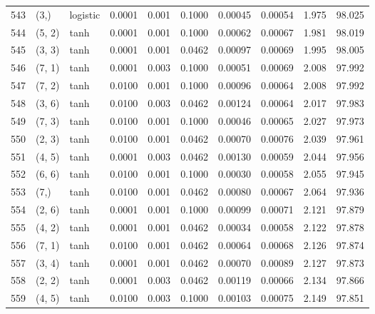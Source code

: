 \begin{tabular}{lllrrrrrrr}
543 &        (3,) &  logistic &  0.0001 &  0.001 &  0.1000 &          0.00045 &    0.00054 &       1.975 &    98.025 \\
544 &      (5, 2) &      tanh &  0.0001 &  0.001 &  0.1000 &          0.00062 &    0.00067 &       1.981 &    98.019 \\
545 &      (3, 3) &      tanh &  0.0001 &  0.001 &  0.0462 &          0.00097 &    0.00069 &       1.995 &    98.005 \\
546 &      (7, 1) &      tanh &  0.0001 &  0.003 &  0.1000 &          0.00051 &    0.00069 &       2.008 &    97.992 \\
547 &      (7, 2) &      tanh &  0.0100 &  0.001 &  0.1000 &          0.00096 &    0.00064 &       2.008 &    97.992 \\
548 &      (3, 6) &      tanh &  0.0100 &  0.003 &  0.0462 &          0.00124 &    0.00064 &       2.017 &    97.983 \\
549 &      (7, 3) &      tanh &  0.0100 &  0.001 &  0.1000 &          0.00046 &    0.00065 &       2.027 &    97.973 \\
550 &      (2, 3) &      tanh &  0.0100 &  0.001 &  0.0462 &          0.00070 &    0.00076 &       2.039 &    97.961 \\
551 &      (4, 5) &      tanh &  0.0001 &  0.003 &  0.0462 &          0.00130 &    0.00059 &       2.044 &    97.956 \\
552 &      (6, 6) &      tanh &  0.0100 &  0.001 &  0.1000 &          0.00030 &    0.00058 &       2.055 &    97.945 \\
553 &        (7,) &      tanh &  0.0100 &  0.001 &  0.0462 &          0.00080 &    0.00067 &       2.064 &    97.936 \\
554 &      (2, 6) &      tanh &  0.0001 &  0.001 &  0.1000 &          0.00099 &    0.00071 &       2.121 &    97.879 \\
555 &      (4, 2) &      tanh &  0.0001 &  0.001 &  0.0462 &          0.00034 &    0.00058 &       2.122 &    97.878 \\
556 &      (7, 1) &      tanh &  0.0100 &  0.001 &  0.0462 &          0.00064 &    0.00068 &       2.126 &    97.874 \\
557 &      (3, 4) &      tanh &  0.0001 &  0.001 &  0.0462 &          0.00070 &    0.00089 &       2.127 &    97.873 \\
558 &      (2, 2) &      tanh &  0.0001 &  0.003 &  0.0462 &          0.00119 &    0.00066 &       2.134 &    97.866 \\
559 &      (4, 5) &      tanh &  0.0100 &  0.003 &  0.1000 &          0.00103 &    0.00075 &       2.149 &    97.851 \\

\end{tabular}
